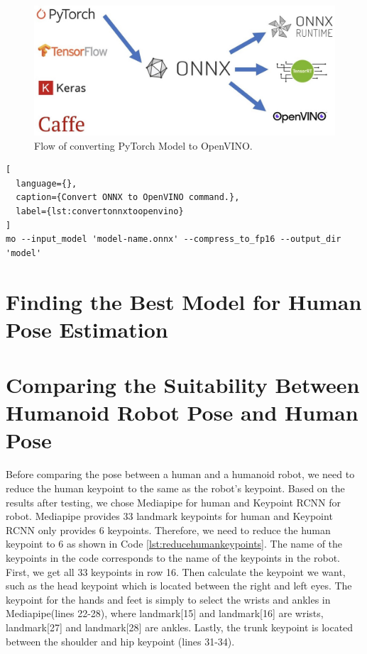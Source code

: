 \begin{figure}[ht]
  \centering
  \includegraphics[scale=0.45]{gambar/pytorch-onnx-openvino.jpg}
  \caption{Flow of converting PyTorch Model to OpenVINO.}
  \label{fig:pytorch-to-openvino}
\end{figure}



\begin{lstlisting}[
  language={},
  caption={Convert ONNX to OpenVINO command.},
  label={lst:convertonnxtoopenvino}
]
mo --input_model 'model-name.onnx' --compress_to_fp16 --output_dir 'model'
\end{lstlisting}




\section{Finding the Best Model for Human Pose Estimation}
\label{sec:findingbestmodelhumanrobot}


\section{Comparing the Suitability Between Humanoid Robot Pose and Human Pose}
\label{sec:comparingsuitability}

Before comparing the pose between a human and a humanoid robot, we need to reduce the human keypoint to the same as the robot's keypoint.
Based on the results after testing, we chose Mediapipe for human and Keypoint RCNN for robot. Mediapipe provides 33 landmark keypoints for human and Keypoint RCNN only provides 6 keypoints.
Therefore, we need to reduce the human keypoint to 6 as shown in Code \ref{lst:reducehumankeypoints}.
The name of the keypoints in the code corresponds to the name of the keypoints in the robot. First, we get all 33 keypoints in row 16. Then calculate the keypoint we want, such as the head keypoint which is located between the right and left eyes.
The keypoint for the hands and feet is simply to select the wrists and ankles in Mediapipe(lines 22-28), where landmark[15] and landmark[16] are wrists, landmark[27] and landmark[28] are ankles. Lastly, the trunk keypoint is located between the shoulder and hip keypoint (lines 31-34).

